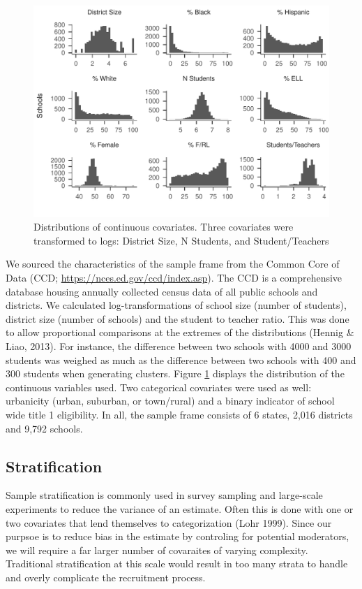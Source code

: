 \documentclass[man,floatsintext]{apa6}
\begin{document}
\begin{figure}
\centering
\includegraphics{GenSamp-Paper_files/figure-latex/plot-dist1-1.pdf}
\caption{\label{fig:plot-dist1}Distributions of continuous covariates. Three covariates were transformed to logs: District Size, N Students, and Student/Teachers}
\end{figure}

We sourced the characteristics of the sample frame from the Common Core of Data (CCD; \url{https://nces.ed.gov/ccd/index.asp}). The CCD is a comprehensive database housing annually collected census data of all public schools and districts. We calculated log-transformations of school size (number of students), district size (number of schools) and the student to teacher ratio. This was done to allow proportional comparisons at the extremes of the distributions (Hennig \& Liao, 2013). For instance, the difference between two schools with 4000 and 3000 students was weighed as much as the difference between two schools with 400 and 300 students when generating clusters. Figure \ref{fig:plot-dist1} displays the distribution of the continuous variables used. Two categorical covariates were used as well: urbanicity (urban, suburban, or town/rural) and a binary indicator of school wide title 1 eligibility. In all, the sample frame consists of 6 states, 2,016 districts and 9,792 schools.

\hypertarget{stratification}{%
\subsection{Stratification}\label{stratification}}

Sample stratification is commonly used in survey sampling and large-scale experiments to reduce the variance of an estimate. Often this is done with one or two covariates that lend themselves to categorization (Lohr 1999). Since our purpsoe is to reduce bias in the estimate by controling for potential moderators, we will require a far larger number of covaraites of varying complexity. Traditional stratification at this scale would result in too many strata to handle and overly complicate the recruitment process.
\end{document}
